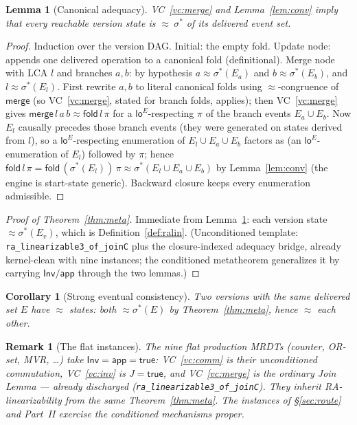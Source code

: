 \documentclass[11pt]{article}
\newtheorem{lemma}[theorem]{Lemma}
\newtheorem{corollary}[theorem]{Corollary}
\newtheorem{remark}[theorem]{Remark}
\newcommand{\loE}[1]{\mathsf{lo}^{#1}}
\newcommand{\lean}[1]{\texttt{#1}}
\newcommand{\st}{\sigma}
\newcommand{\merge}{\mathsf{merge}}
\newcommand{\eqobs}{\approx}
\newcommand{\fold}{\mathsf{fold}}
\newcommand{\Inv}{\mathsf{Inv}}
\newcommand{\app}{\mathsf{app}}
\newcommand{\sigmacan}{\st^{\ast}}
\begin{document}
\begin{lemma}[Canonical adequacy]\label{lem:adeq}
VC~\ref{vc:merge} and Lemma~\ref{lem:conv} imply that every reachable version state is
$\eqobs\ \sigmacan$ of its delivered event set.
\end{lemma}
\begin{proof}
Induction over the version DAG. Initial: the empty fold. Update node: appends one delivered
operation to a canonical fold (definitional). Merge node with LCA $l$ and branches $a,b$: by
hypothesis $a \eqobs \sigmacan(E_a)$ and $b \eqobs \sigmacan(E_b)$, and $l \eqobs
\sigmacan(E_l)$. First rewrite $a,b$ to literal canonical folds using $\eqobs$-congruence of
$\merge$ (so VC~\ref{vc:merge}, stated for branch folds, applies); then VC~\ref{vc:merge}
gives $\merge\,l\,a\,b \eqobs \fold\,l\,\pi$ for a $\loE{E}$-respecting $\pi$ of the branch
events $E_a \cup E_b$. Now $E_l$ causally precedes those branch events (they were generated on
states derived from $l$), so a $\loE{E}$-respecting enumeration of $E_l \cup E_a \cup E_b$
factors as (an $\loE{E}$-enumeration of $E_l$) followed by $\pi$; hence
$\fold\,l\,\pi = \fold\,(\sigmacan(E_l))\,\pi \eqobs \sigmacan(E_l \cup E_a \cup E_b)$ by
Lemma~\ref{lem:conv} (the engine is start-state generic). Backward closure keeps every
enumeration admissible.
\end{proof}

\begin{proof}[Proof of Theorem~\ref{thm:meta}]
Immediate from Lemma~\ref{lem:adeq}: each version state $\eqobs \sigmacan(E_v)$, which is
Definition~\ref{def:ralin}. (Unconditioned template: \lean{ra\_linearizable3\_of\_joinC} plus
the closure-indexed adequacy bridge, already kernel-clean with nine instances; the
conditioned metatheorem generalizes it by carrying $\Inv/\app$ through the two lemmas.)
\end{proof}

\begin{corollary}[Strong eventual consistency]\label{cor:sec}
Two versions with the same delivered set $E$ have $\eqobs$ states: both $\eqobs \sigmacan(E)$
by Theorem~\ref{thm:meta}, hence $\eqobs$ each other.
\end{corollary}

\begin{remark}[The flat instances]
The nine flat production MRDTs (counter, OR-set, MVR, \dots) take $\Inv=\app=\mathsf{true}$:
VC~\ref{vc:comm} is their unconditioned commutation, VC~\ref{vc:inv} is $J=\mathsf{true}$,
and VC~\ref{vc:merge} is the ordinary Join Lemma --- already discharged
(\lean{ra\_linearizable3\_of\_joinC}). They inherit RA-linearizability from the same
Theorem~\ref{thm:meta}. The instances of \S\ref{sec:route} and Part~II
exercise the conditioned mechanisms proper.
\end{remark}
\end{document}
